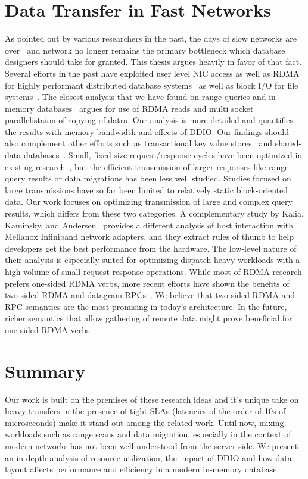\section{Data Transfer in Fast Networks}
As pointed out by various researchers in the past, the days of slow networks are over~\cite{slow} 
and network no longer remains the primary bottleneck which database designers should take for granted.
This thesis argues heavily in favor of that fact. Several efforts in the past have exploited
user level NIC access as well as RDMA for highly performant distributed database systems~\cite{ramcloud,farm,farmtx,drtm,hyper}
as well as block I/O for file systems~\cite{rdmagfs}. The closest analysis that we have found on 
range queries and in-memory databases~\cite{zerocopyrangequery} argues for use of RDMA reads and 
multi socket parallelistaion of copying of datra. Our analysis is more detailed and quantifies the 
results with memory bandwidth and effects of DDIO.
Our findings should also complement other efforts such as transactional key value stores~\cite{deuteronomy} 
and shared-data databases~\cite{tell}. Small, fixed-size request/response cycles have been optimized in
existing research~\cite{farm,herd,mica,rdma,ramcloud}, but the efficient
transmission of larger responses like range query results or data
migrations has been less well studied. Studies focused on large transmissions
have so far been limited to relatively static block-oriented data.
Our work focuses on optimizing transmission of large and complex query
results, which differs from these two categories. A complementary study by Kalia, Kaminsky, and Andersen~\cite{rdma} provides a
different analysis of host interaction with Mellanox Infiniband network adapters,
and they extract rules of thumb to help developers get the best performance from the hardware.
The low-level nature of their analysis is especially suited for
optimizing dispatch-heavy workloads with a high-volume of small
request-response operations. While most of RDMA research prefers one-sided RDMA verbs, more recent efforts have shown 
the benefits of two-sided RDMA and datagram RPCs~\cite{fasst}. We believe that 
two-sided RDMA and RPC semantics are the most promising in today's architecture. In the future, 
richer semantics that allow  gathering of remote data might prove beneficial for one-sided RDMA verbs.


\section{Summary}
Our work is built on the premises of these research ideas and it's unique take on
heavy transfers in the presence of tight SLAs (latencies of the order of 10s of microseconds)
make it stand out among the related work. Until now, mixing workloads such as range scans 
and data migration, especially in the context of modern networks has not been well
 understood from the server side. We present an in-depth analysis of resource utilization, 
 the impact of DDIO and how data layout affects performance and efficiency in a modern 
 in-memory database.